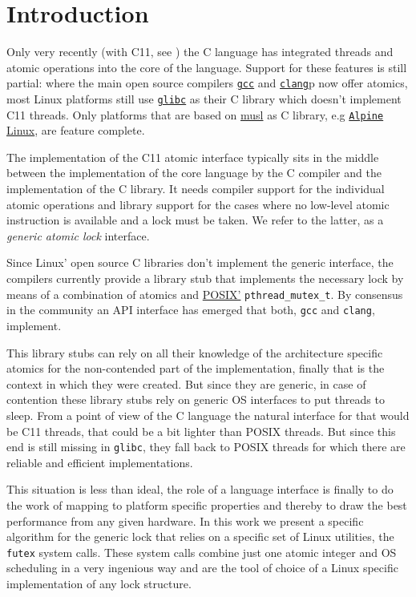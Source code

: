 
\section{Introduction}
\label{sec-1}

Only very recently (with C11, see \cite{C11}) the C language has
integrated threads and atomic operations into the core of the
language.  Support for these features is still partial: where the
main open source compilers \href{https://gcc.gnu.org/}{\texttt{gcc}} and
\href{http://clang.llvm.org/}{\texttt{clang}}p now offer atomics, most Linux
platforms still use \href{https://www.gnu.org/software/libc/}{\texttt{glibc}}
as their C library which doesn't implement C11 threads. Only
platforms that are based on \href{http://musl-libc.org}{musl} as C
library, e.g \href{http://alpinelinux.org/}{\texttt{Alpine} Linux}, are
feature complete.

The implementation of the C11 atomic interface typically sits in the
middle between the implementation of the core language by the C
compiler and the implementation of the C library. It needs compiler
support for the individual atomic operations and library support for
the cases where no low-level atomic instruction is available and a
lock must be taken. We refer to the latter, as a \emph{generic atomic
lock} interface.

Since Linux' open source C libraries don't implement the generic
interface, the compilers currently provide a library stub that
implements the necessary lock by means of a combination of atomics
and \href{http://pubs.opengroup.org/onlinepubs/9699919799/}{POSIX'}
\texttt{pthread\_mutex\_t}. By consensus in the community an API interface
has emerged that both, \texttt{gcc} and \texttt{clang}, implement.

This library stubs can rely on all their knowledge of the
architecture specific atomics for the non-contended part of the
implementation, finally that is the context in which they were
created. But since they are generic, in case of contention these
library stubs rely on generic OS interfaces to put threads to
sleep. From a point of view of the C language the natural interface
for that would be C11 threads, that could be a bit lighter than
POSIX threads. But since this end is still missing in \texttt{glibc}, they
fall back to POSIX threads for which there are reliable and
efficient implementations.

This situation is less than ideal, the role of a language interface
is finally to do the work of mapping to platform specific properties
and thereby to draw the best performance from any given hardware. In
this work we present a specific algorithm for the generic lock that
relies on a specific set of Linux utilities, the \texttt{futex} system
calls. These system calls combine just one atomic integer and OS
scheduling in a very ingenious way and are the tool of choice of a
Linux specific implementation of any lock structure.

